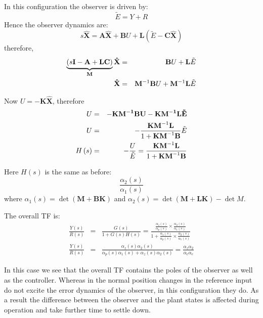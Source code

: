 In this configuration the observer is driven by:
\[
\tilde E =  Y + R
\] 
Hence the observer dynamics are:
\[
s\hat{\mathbf{X}}=\mathbf{A}\hat{\mathbf{X}}+\mathbf{B}U+\mathbf{L}(\tilde E - \mathbf{C}\hat{\mathbf{X}})
\]
therefore,
\begin{eqnarray*}
	\underbrace {\left( {s{\bf{I}} - {\bf{A}} + {\bf{LC}}} \right)}_{\bf{M}}{\bf{\hat X}} & = & {\bf{B}}U + {\bf{L}}\tilde E \\
	{\bf{\hat X}} & = & {\bf{M}}^{ - 1} {\bf{B}}U + {\bf{M}}^{ - 1} {\bf{L}}\tilde E
\end{eqnarray*}

Now $U=-\mathbf{K}\hat{\mathbf{X}}$, therefore
\begin{eqnarray*}
	U & = &  - \bf{KM}^{ - 1} {\bf{B}}U - {\bf{KM}}^{ - 1} {\bf{L}}\tilde E \\
	U & = &  - \frac{{{\bf{KM}}^{ - 1} {\bf{L}}}}{{1 + {\bf{KM}}^{ - 1} {\bf{B}}}}\tilde E \\
	H\left( s \right) & = &  - \frac{U}{{\tilde E}} = \frac{{{\bf{KM}}^{ - 1} {\bf{L}}}}{{1 + {\bf{KM}}^{ - 1} {\bf{B}}}}
\end{eqnarray*}

Here $H(s)$ is the same as before:
\[
\frac{\alpha_2(s)}{\alpha_1(s)}
\]
where $\alpha_1(s)=\det(\mathbf{M}+\mathbf{BK})$ and $\alpha_2(s)=\det(\mathbf{M}+\mathbf{LK})-\det{M}$.
 
The overall TF is:
\begin{eqnarray*}
	\frac{Y(s)}{R(s)} &=& \frac{G(s)}{1+G(s)H(s)}= \frac{\frac{\alpha_z(s)}{\alpha_p(s)}\times\frac{\alpha_2(s)}{\alpha_1(s)}}{1+\frac{\alpha_z(s)}{\alpha_p(s)}\times\frac{\alpha_2(s)}{\alpha_1(s)}} \\
	\frac{Y(s)}{R(s)} &=& \frac{\alpha_z(s)\alpha_2(s)}{\alpha_p(s)\alpha_1(s)+\alpha_z(s)\alpha_2(s)}=\frac{\alpha_z\alpha_2}{\alpha_c\alpha_e}
\end{eqnarray*}
 

In this case we see that the overall TF contains the poles of the observer as well as the controller.
Whereas in the normal position changes in the reference input do not excite the error dynamics of the observer, in this configuration they do.
As a result the difference between the observer and the plant states is affected during operation and take further time to settle down.








\endinput

